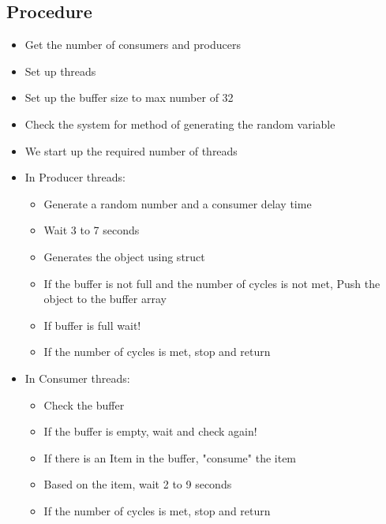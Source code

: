 \documentclass[journal,10pt,onecolumn,compsoc,letterpaper,draftclsnofoot,table,xcdraw]{IEEEtran} \usepackage[margin=0.75in]{geometry}
\begin{document}
\subsection{Procedure}
\begin{itemize}
\item Get the number of consumers and producers
\item Set up threads
\item Set up the buffer size to max number of 32
\item Check the system for method of generating the random variable
\item We start up the required number of threads
\item In Producer threads:
	\begin{itemize}
	\item Generate a random number and a consumer delay time
    \item Wait 3 to 7 seconds
    \item Generates the object using struct
    \item If the buffer is not full and the number of cycles is not met, Push the object to the buffer array
    \item If buffer is full wait!
    \item If the number of cycles is met, stop and return
	\end{itemize}
\item In Consumer threads:
	\begin{itemize}
	\item Check the buffer
    \item If the buffer is empty, wait and check again!
    \item If there is an Item in the buffer, "consume" the item
    \item Based on the item, wait 2 to 9 seconds
    \item If the number of cycles is met, stop and return
	\end{itemize}
\end{itemize}
\end{document}
